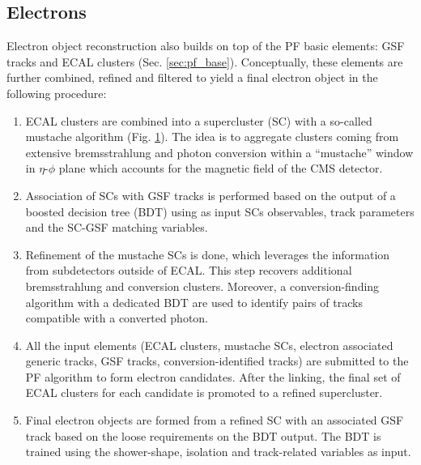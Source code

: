 \subsection{Electrons}\label{sec:reco_e}
Electron object reconstruction \cite{CMS:2020uim} also builds on top of the PF basic elements: GSF tracks and ECAL clusters (Sec. \ref{sec:pf_base}). Conceptually, these elements are further combined, refined and filtered to yield a final electron object in the following procedure: 
\begin{enumerate}

\begin{figure}[ht!]
    \centering
    \texttt{[image: Figures/CP\_etau/mustache.png]}
    \caption{Distribution of PF clusters around the seed cluster for simulated electrons with $1 < E_T^{\text{seed}} < 10~\text{GeV}$ and $1.48 < \eta^{\text{seed}} < 1.75$ \cite{CMS:2020uim}. The $z$ axis shows the number of PF clusters around the seed matched to simulation. The red line illustrates the region where the clusters are selected by the mustache algorithm.}
    \label{fig:mustache}
\end{figure}

    \item ECAL clusters are combined into a supercluster (SC) with a so-called mustache algorithm (Fig. \ref{fig:mustache}). The idea is to aggregate clusters coming from extensive bremsstrahlung and photon conversion within a \enquote{mustache} window in $\eta$-$\phi$ plane which accounts for the magnetic field of the CMS detector.

    \item Association of SCs with GSF tracks is performed based on the output of a boosted decision tree (BDT) using as input SCs observables, track parameters and the SC-GSF matching variables.
    \item Refinement of the mustache SCs is done, which leverages the information from subdetectors outside of ECAL. This step recovers additional bremsstrahlung and conversion clusters. Moreover, a conversion-finding algorithm \cite{CMS:2015myp} with a dedicated BDT are used to identify pairs of tracks compatible with a converted photon.
    
    \item All the input elements (ECAL clusters, mustache SCs, electron associated generic tracks, GSF tracks, conversion-identified tracks) are submitted to the PF algorithm to form electron candidates. After the linking, the final set of ECAL clusters for each candidate is promoted to a refined supercluster.
    
    \item Final electron objects are formed from a refined SC with an associated GSF track based on the loose requirements on the BDT output. The BDT is trained using the shower-shape, isolation and track-related variables as input.
\end{enumerate}

